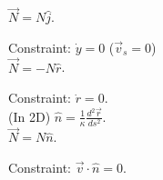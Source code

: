 \documentclass[10pt]{scrartcl}
\begin{document}
\begin{minipage}[c]{6cm}
  $\vec{N} = N\hat{j}$. 
  
  Constraint: $\dot{y} = 0$ ($\vec{v}_s = 0$)\\[2cm]
  
  $\vec{N} = -N\hat{r}$.
  
  Constraint: $\dot{r} = 0$.\\[1.5cm]
  
  (In 2D) $\hat{n} = \frac{1}{\kappa}\frac{d^2\vec{r}}{ds^2}$.\\[0.1cm]
  
  $\vec{N} = N\hat{n}$.
  
  Constraint: $\vec{v} \cdot \hat{n} = 0$.\\[1cm] 
 \end{minipage}
 
\end{document}
